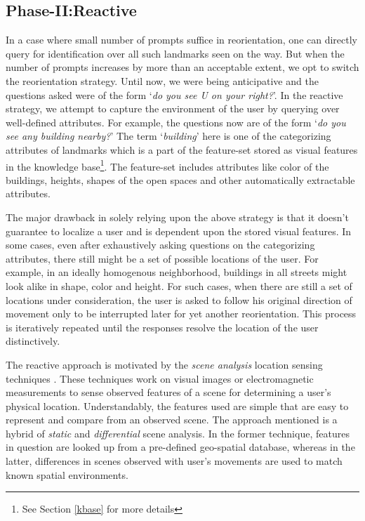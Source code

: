 \documentclass{iitkthesis}
\begin{document}
\subsection*{Phase-II:Reactive}
In a case where small number of prompts suffice in reorientation, one can directly query for identification over all such landmarks seen on the way. But when the number of prompts increases by more than an acceptable extent, we opt to switch the reorientation strategy. Until now, we were being anticipative and the questions asked were of the form `\textit{do you see U on your right?}'. In the reactive strategy, we attempt to capture the environment of the user by querying over well-defined attributes. For example, the questions now are of the form `\textit{do you see any building nearby?}' The term `\textit{building}' here is one of the categorizing attributes of landmarks which is a part of the feature-set stored as visual features in the knowledge base\footnote{See Section \ref{kbase} for more details}. The feature-set includes attributes like color of the buildings, heights, shapes of the open spaces and other automatically extractable attributes.

The major drawback in solely relying upon the above strategy is that it doesn't guarantee to localize a user and is dependent upon the stored visual features. In some cases, even after exhaustively asking questions on the categorizing attributes, there still might be a set of possible locations of the user. For example, in an ideally homogenous neighborhood, buildings in all streets might look alike in shape, color and height. For such cases, when there are still a set of locations under consideration, the user is asked to follow his original direction of movement only to be interrupted later for yet another reorientation. This process is iteratively repeated until the responses resolve the location of the user distinctively.

The reactive approach is motivated by the \textit{scene analysis} location sensing techniques \cite{hightower}. These techniques work on visual images or electromagnetic measurements to sense observed features of a scene for determining a user's physical location. Understandably, the features used are simple that are easy to represent and compare from an observed scene. The approach mentioned is a hybrid of \textit{static} and \textit{differential} scene analysis. In the former technique, features in question are looked up from a pre-defined geo-spatial database, whereas in the latter, differences in scenes observed with user's movements are used to match known spatial environments.
\end{document}
